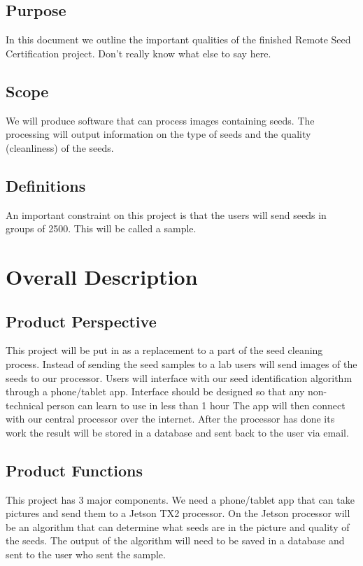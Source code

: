\documentclass[onecolumn, draftclsnofoot,10pt, compsoc]{IEEEtran}
\begin{document}
\subsection{Purpose}
In this document we outline the important qualities of the finished Remote Seed Certification project.
Don't really know what else to say here.

\subsection{Scope}
We will produce software that can process images containing seeds.
The processing will output information on the type of seeds and the quality (cleanliness) of the seeds.

\subsection{Definitions}
An important constraint on this project is that the users will send seeds in groups of 2500.
This will be called a sample.

\section{Overall Description}
\subsection{Product Perspective}
This project will be put in as a replacement to a part of the seed cleaning process.
Instead of sending the seed samples to a lab users will send images of the seeds to our processor.
Users will interface with our seed identification algorithm through a phone/tablet app.
Interface should be designed so that any non-technical person can learn to use in less than 1 hour
The app will then connect with our central processor over the internet.
After the processor has done its work the result will be stored in a database and sent back
to the user via email.

\subsection{Product Functions}
This project has 3 major components.
We need a phone/tablet app that can take pictures and send them to a Jetson TX2 processor.
On the Jetson processor will be an algorithm that can determine what seeds are in the picture and quality of the seeds.
The output of the algorithm will need to be saved in a database and sent to the user who sent the sample.
\end{document}
